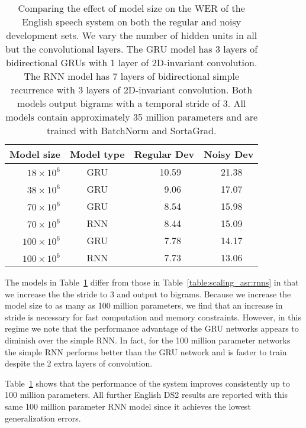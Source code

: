 \begin{table}
\centering
\begin{tabular}{r  c  r r r  r r r}
\toprule
Model size & Model type & \multicolumn{3}{c}{Regular Dev} & \multicolumn{3}{c}{Noisy Dev} \\
\midrule
$18  \times 10^6$    & GRU &   & 10.59 & &  & 21.38 & \\
$38  \times 10^6$    & GRU &   & 9.06  & &  & 17.07 & \\
$70  \times 10^6$    & GRU &   & 8.54  & &  & 15.98 & \\
$70  \times 10^6$    & RNN &   & 8.44  & &  & 15.09 & \\
$100 \times 10^6$    & GRU &   & 7.78  & &  & 14.17 & \\
$100 \times 10^6$    & RNN &   & 7.73  & &  & 13.06 & \\
\bottomrule
\end{tabular}
\caption{Comparing the effect of model size on the WER of the English speech
    system on both the regular and noisy development sets. We vary the number
    of hidden units in all but the convolutional layers. The GRU model has 3
    layers of bidirectional GRUs with 1 layer of 2D-invariant convolution. The
    RNN model has 7 layers of bidirectional simple recurrence with 3 layers of
    2D-invariant convolution. Both models output bigrams with a temporal stride
    of 3. All models contain approximately 35 million parameters and are
    trained with BatchNorm and SortaGrad.}
\label{table:scaling_asr:modelsize}
\end{table}

The models in Table~\ref{table:scaling_asr:modelsize} differ from those in
Table~\ref{table:scaling_asr:rnns} in that we increase the the stride to 3 and
output to bigrams. Because we increase the model size to as many as 100 million
parameters, we find that an increase in stride is necessary for fast
computation and memory constraints. However, in this regime we note that the
performance advantage of the GRU networks appears to diminish over the simple
RNN. In fact, for the 100 million parameter networks the simple RNN performs
better than the GRU network and is faster to train despite the 2 extra layers
of convolution.

Table~\ref{table:scaling_asr:modelsize} shows that the performance of the
system improves consistently up to 100 million parameters. All further English
DS2 results are reported with this same 100 million parameter RNN model since
it achieves the lowest generalization errors.

